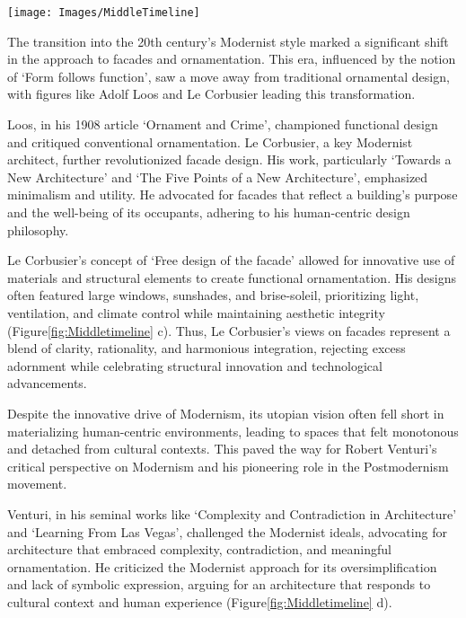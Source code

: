 \begin{figure*}[htb]
\centering
\texttt{[image: Images/MiddleTimeline]}
\caption{Example of historical oscillations between complexity and simplicity in architecture history. (Left to right) Art Nouveau, Art Deco, Modernism, Post Modernism. (\textit{Images edited from source})}
\label{fig:Middletimeline}
\end{figure*}


The transition into the 20th century's Modernist style marked a significant shift in the approach to facades and ornamentation.
This era, influenced by the notion of `Form follows function', saw a move away from traditional ornamental design, with figures like Adolf Loos and Le Corbusier leading this transformation.

Loos, in his 1908 article `Ornament and Crime', championed functional design and critiqued conventional ornamentation\cite{Saglam2014}.
Le Corbusier, a key Modernist architect, further revolutionized facade design.
His work, particularly `Towards a New Architecture'\cite{Studio2a2023} and `The Five Points of a New Architecture', emphasized minimalism and utility.
He advocated for facades that reflect a building's purpose and the well-being of its occupants, adhering to his human-centric design philosophy\cite{Virseda2021}.

Le Corbusier's concept of `Free design of the facade'\cite{Corbusier1986} allowed for innovative use of materials and structural elements to create functional ornamentation.
His designs often featured large windows, sunshades, and brise-soleil, prioritizing light, ventilation, and climate control while maintaining aesthetic integrity (Figure\ref{fig:Middletimeline} c).
Thus, Le Corbusier's views on facades represent a blend of clarity, rationality, and harmonious integration, rejecting excess adornment while celebrating structural innovation and technological advancements.


Despite the innovative drive of Modernism, its utopian vision often fell short in materializing human-centric environments, leading to spaces that felt monotonous and detached from cultural contexts.
This paved the way for Robert Venturi's critical perspective on Modernism and his pioneering role in the Postmodernism movement.

Venturi, in his seminal works like `Complexity and Contradiction in Architecture' and `Learning From Las Vegas', challenged the Modernist ideals, advocating for architecture that embraced complexity, contradiction, and meaningful ornamentation\cite{Venturi1972, Venturi1977}.
He criticized the Modernist approach for its oversimplification and lack of symbolic expression, arguing for an architecture that responds to cultural context and human experience (Figure\ref{fig:Middletimeline} d).

